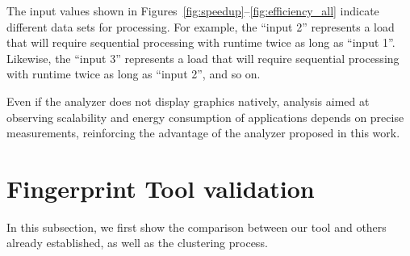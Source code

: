 The input values shown in Figures~\ref{fig:speedup}--\ref{fig:efficiency_all} indicate different data sets for processing. For example, the ``input 2'' represents a load that will require sequential processing with runtime twice as long as ``input 1''. Likewise, the ``input 3'' represents a load that will require sequential processing with runtime twice as long as ``input 2'', and so on.

Even if the analyzer does not display graphics natively, analysis aimed at observing scalability and energy consumption of applications depends on precise measurements, reinforcing the advantage of the analyzer proposed in this work.




\section{Fingerprint Tool validation} \label{sec:fingerprint_tool_validation}

In this subsection, we first show the comparison between our tool and others already established, as well as the clustering process.


